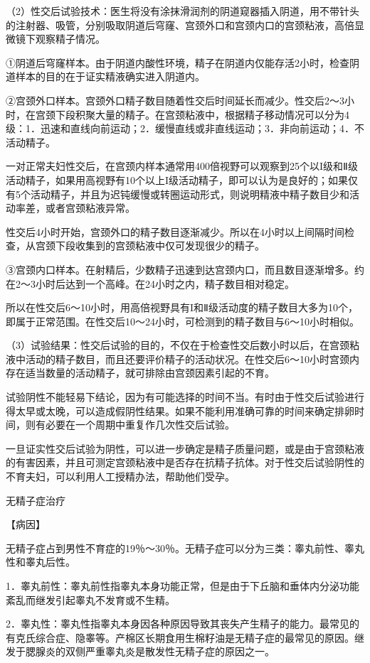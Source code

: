 \documentclass[12pt,UTF8,openany]{ctexbook}
\begin{document}
（2）性交后试验技术：医生将没有涂抹滑润剂的阴道窥器插入阴道，用不带针头的注射器、吸管，分别吸取阴道后穹窿、宫颈外口和宫颈内口的宫颈粘液，高倍显微镜下观察精子情况。

①阴道后穹窿样本。由于阴道内酸性环境，精子在阴道内仅能存活2小时，检查阴道样本的目的在于证实精液确实进入阴道内。

②宫颈外口样本。宫颈外口精子数目随着性交后时间延长而减少。性交后2～3小时，在宫颈下段积聚大量的精子。在宫颈粘液中，根据精子移动情况可以分为4级：1．迅速和直线向前运动；2．缓慢直线或非直线运动；3．非向前运动；4．不活动精子。

一对正常夫妇性交后，在宫颈内样本通常用400倍视野可以观察到25个以I级和Ⅱ级活动精子，如果用高视野有10个以上I级活动精子，即可以认为是良好的；如果仅有5个活动精子，并且为迟钝缓慢或转圈运动形式，则说明精液中精子数目少和活动率差，或者宫颈粘液异常。

性交后4小时开始，宫颈外口的精子数目逐渐减少。所以在4小时以上间隔时间检查，从宫颈下段收集到的宫颈粘液中仅可发现很少的精子。

③宫颈内口样本。在射精后，少数精子迅速到达宫颈内口，而且数目逐渐增多。约在2～3小时后达到一个高峰。在24小时之内，精子数目相对稳定。

所以在性交后6～10小时，用高倍视野具有I和Ⅱ级活动度的精子数目大多为10个，即属于正常范围。在性交后10～24小时，可检测到的精子数目与6～10小时相似。

（3）试验结果：性交后试验的目的，不仅在于检查性交后数小时以后，在宫颈粘液中活动的精子数目，而且还要评价精子的活动状况。在性交后6～10小时宫颈内存在适当数量的活动精子，就可排除由宫颈因素引起的不育。

试验阴性不能轻易下结论，因为有可能选择的时间不当。有时由于性交后试验进行得太早或太晚，可以造成假阴性结果。如果不能利用准确可靠的时间来确定排卵时间，则有必要在一个周期中重复作几次性交后试验。

一旦证实性交后试验为阴性，可以进一步确定是精子质量问题，或是由于宫颈粘液的有害因素，并且可测定宫颈粘液中是否存在抗精子抗体。对于性交后试验阴性的不育夫妇，可以利用人工授精办法，帮助他们受孕。





无精子症治疗


【病因】

无精子症占到男性不育症的19％～30％。无精子症可以分为三类：睾丸前性、睾丸性和睾丸后性。

1．睾丸前性：睾丸前性指睾丸本身功能正常，但是由于下丘脑和垂体内分泌功能紊乱而继发引起睾丸不发育或不生精。

2．睾丸性：睾丸性指睾丸本身因各种原因导致其丧失产生精子的能力。最常见的有克氏综合症、隐睾等。产棉区长期食用生棉籽油是无精子症的最常见的原因。继发于腮腺炎的双侧严重睾丸炎是散发性无精子症的原因之一。
\end{document}
